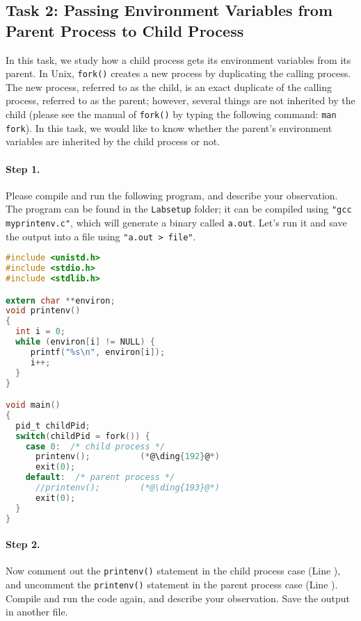 \subsection{Task 2: Passing Environment Variables from Parent Process to Child Process}


In this task, we study how a child process gets
its environment variables from its parent. In Unix,
{\tt fork()} creates a new process by duplicating the calling process.
The new process, referred to as the child, is an exact duplicate of the calling
process, referred to as the parent; however, several things
are not inherited by the child (please see the manual of {\tt fork()} by
typing the following command: {\tt man fork}). In this task,
we would like to know whether the parent's environment variables
are inherited by the child process or not.


\paragraph{Step 1.} Please compile and run the following
program, and describe your observation. The program
can be found in the \texttt{Labsetup} folder; it can be 
compiled using \texttt{"gcc myprintenv.c"}, which 
will generate a binary called \texttt{a.out}. 
Let's run it and save the output into a file 
using \texttt{"a.out > file"}.

\begin{lstlisting}[language=C, caption={\texttt{myprintenv.c}}]
#include <unistd.h>
#include <stdio.h>
#include <stdlib.h>

extern char **environ;
void printenv()
{
  int i = 0;
  while (environ[i] != NULL) {
     printf("%s\n", environ[i]);
     i++;
  }
}

void main()
{
  pid_t childPid;
  switch(childPid = fork()) {
    case 0:  /* child process */
      printenv();          (*@\ding{192}@*)
      exit(0);
    default:  /* parent process */
      //printenv();        (*@\ding{193}@*)
      exit(0);
  }
}
\end{lstlisting}

\paragraph{Step 2.} Now comment out the {\tt printenv()} statement in
the child process case (Line ),
and uncomment the {\tt printenv()} statement in
the parent process case (Line ).
Compile and run the code again, and describe your
observation. Save the output in another file.


